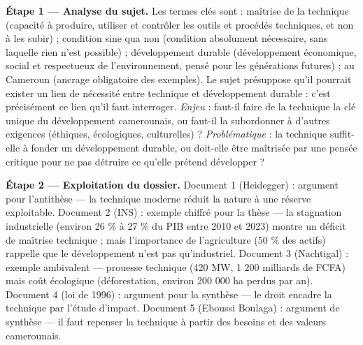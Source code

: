 \documentclass[11pt]{article}
\newcommand{\cle}[1]{{\popxbold\color{popdark}#1}}
\begin{document}
\begin{exoresolu}
\textbf{Étape 1 — Analyse du sujet.} Les termes clés sont : \cle{maîtrise de la technique} (capacité à produire, utiliser et contrôler les outils et procédés techniques, et non à les subir) ; \cle{condition sine qua non} (condition absolument nécessaire, sans laquelle rien n'est possible) ; \cle{développement durable} (développement économique, social et respectueux de l'environnement, pensé pour les générations futures) ; \cle{au Cameroun} (ancrage obligatoire des exemples). Le sujet présuppose qu'il pourrait exister un lien de nécessité entre technique et développement durable : c'est précisément ce lien qu'il faut interroger. \emph{Enjeu} : faut-il faire de la technique la clé unique du développement camerounais, ou faut-il la subordonner à d'autres exigences (éthiques, écologiques, culturelles) ? \emph{Problématique} : la technique suffit-elle à fonder un développement durable, ou doit-elle être maîtrisée par une pensée critique pour ne pas détruire ce qu'elle prétend développer ?

\tcblower

\textbf{Étape 2 — Exploitation du dossier.} Document 1 (Heidegger) : argument pour l'antithèse — la technique moderne réduit la nature à une réserve exploitable. Document 2 (INS) : exemple chiffré pour la thèse — la stagnation industrielle (environ 26 \% à 27 \% du PIB entre 2010 et 2023) montre un déficit de maîtrise technique ; mais l'importance de l'agriculture (50 \% des actifs) rappelle que le développement n'est pas qu'industriel. Document 3 (Nachtigal) : exemple ambivalent — prouesse technique (420 MW, 1 200 milliards de FCFA) mais coût écologique (déforestation, environ 200 000 ha perdus par an). Document 4 (loi de 1996) : argument pour la synthèse — le droit encadre la technique par l'étude d'impact. Document 5 (Eboussi Boulaga) : argument de synthèse — il faut repenser la technique à partir des besoins et des valeurs camerounais.


\end{exoresolu}
\end{document}
